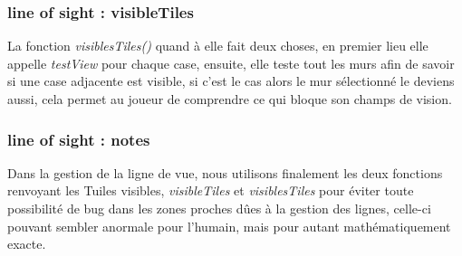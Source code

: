 \documentclass[a4paper,12pt]{article} %
\begin{document}
\subsubsection{line of sight : visibleTiles}
La fonction \textit{visiblesTiles()} quand à elle fait deux choses, en premier lieu elle appelle \textit{testView} pour chaque case, ensuite, elle teste tout les murs afin de savoir si une case adjacente est visible, si c'est le cas alors le mur sélectionné le deviens aussi, cela permet au joueur de comprendre ce qui  bloque son champs de vision.
\subsubsection{line of sight : notes}
Dans la gestion de la ligne de vue, nous utilisons finalement les deux fonctions renvoyant les Tuiles visibles, \textit{visibleTiles} et \textit{visiblesTiles} pour éviter toute possibilité de bug dans les zones proches dûes à la gestion des lignes, celle-ci pouvant sembler anormale pour l'humain, mais pour autant mathématiquement exacte.
\end{document}
